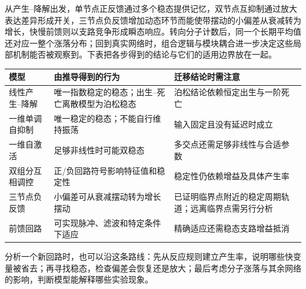 从产生--降解出发，单节点正反馈通过多个稳态提供记忆，双节点互抑制通过放大表达差异形成开关，三节点负反馈增加动态环节而能使带摆动的小偏差从衰减转为增长，快慢前馈则以支路竞争形成瞬态响应。转向分子计数后，同一个长期平均值还对应一整个涨落分布；回到真实网络时，组合逻辑与模块耦合进一步决定这些局部机制能否被观察到。下表把各步得到的结论与它们的适用边界放在一起。
\begin{center}\begin{tabular}{>{\raggedright\arraybackslash}p{3.1cm}>{\raggedright\arraybackslash}p{6cm}>{\raggedright\arraybackslash}p{5.6cm}}\toprule
模型 & 由推导得到的行为 & 迁移结论时需注意\\\midrule
线性产生--降解 & 唯一指数稳定的稳态；出生--死亡离散模型为泊松稳态 & 泊松结论依赖恒定出生与一阶死亡\\
一维单调自抑制 & 唯一稳定的稳态；不能自行维持振荡 & 输入固定且没有延迟时成立\\
一维自激活 & 足够非线性时可能双稳态 & 多交点还需足够非线性与合适参数\\
双组分互相调控 & 正/负回路符号影响特征值和稳定性 & 稳定性仍依赖增益及具体产生率\\
三节点负反馈 & 小偏差可从衰减摆动转为增长摆动 & 已证明临界点附近的稳定周期轨道；远离临界点需另行分析\\
前馈回路 & 可实现脉冲、滤波和特定条件下适应 & 精确适应还需稳态支路增益抵消\\
\bottomrule\end{tabular}\end{center}

分析一个新回路时，也可以沿这条路线：先从反应规则建立产生率，说明哪些快变量被省去；再寻找稳态，检查偏差会恢复还是放大；最后考虑分子涨落与其余网络的影响，判断模型能解释哪些实验现象。
